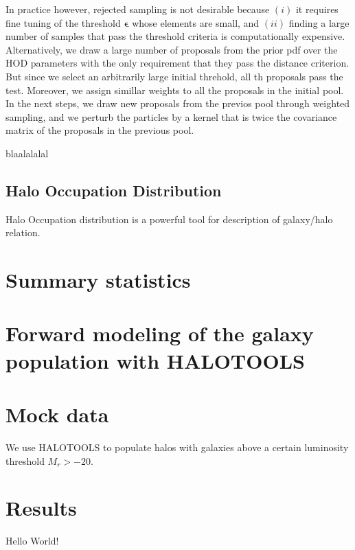 \documentclass[12pt, preprint]{aastex}
\begin{document}
In practice however, rejected sampling is not desirable because $(i)$ it requires fine tuning of the threshold 
$\bm{\epsilon}$ whose elements are small, and $(ii)$ finding a large number of samples that pass the threshold 
criteria is computationally expensive. Alternatively, we draw a large number of proposals from the prior pdf over 
the HOD parameters with the only requirement that they pass the distance criterion. But since we select an 
arbitrarily large initial threhold, all th proposals pass the test. Moreover, we assign simillar weights to all 
the proposals in the initial pool. In the next steps, we draw new proposals from the previos pool through 
weighted sampling, and we perturb the particles by a kernel that is twice the covariance matrix of the proposals 
in the previous pool.   

blaalalalal

\subsection{Halo Occupation Distribution}

Halo Occupation distribution is a powerful tool for description of galaxy/halo relation.


\section{Summary statistics}

\section{Forward modeling of the galaxy population with HALOTOOLS}


\section{Mock data}

We use HALOTOOLS to populate halos with galaxies above a certain luminosity threshold $M_r>-20$.


\section{Results}

Hello World!

\begin{thebibliography}{70}


\end{thebibliography}
\end{document}
